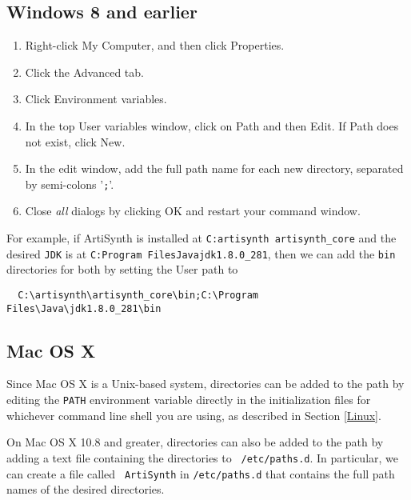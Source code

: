 \documentclass{article}
\begin{document}
\subsection*{Windows 8 and earlier}

\begin{enumerate}

\item Right-click {\sf My Computer}, and then click {\sf Properties}.

\item Click the {\sf Advanced} tab.

\item Click {\sf Environment variables}.

\item In the top {\sf User variables} window, click on {\sf Path} and 
then {\sf Edit}. If {\sf Path} does not exist, click {\sf New}.

\item In the edit window, add the full path name for each new directory,
separated by semi-colons '{\tt ;}'.

\item Close {\it all} dialogs by clicking {\sf OK} and restart 
your command window.

\end{enumerate}

For example, if ArtiSynth is installed at {\tt C:\BKS artisynth\BKS
artisynth\_core} and the desired {\tt JDK} is at {\tt C:\BKS Program
Files\BKS Java\BKS jdk1.8.0\_281}, then we can add the {\tt bin}
directories for both by setting the User path to
\begin{verbatim}
  C:\artisynth\artisynth_core\bin;C:\Program Files\Java\jdk1.8.0_281\bin
\end{verbatim}

\subsection*{Mac OS X}

Since Mac OS X is a Unix-based system, directories can be added to the
path by editing the {\tt PATH} environment variable directly in the
initialization files for whichever command line shell you are using,
as described in Section \ref{Linux}.

On Mac OS X 10.8 and greater, directories can also be added to the
path by adding a text file containing the directories to {\tt
/etc/paths.d}.  In particular, we can create a file called {\tt
ArtiSynth} in {\tt /etc/paths.d} that contains the full path names of
the desired directories.
\end{document}
